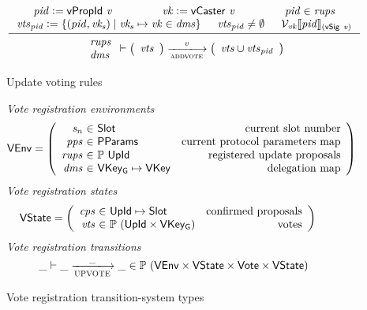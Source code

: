 \begin{figure}[htb]
  \begin{equation}
    \label{eq:rule:voting}
    \inference
    {
      \var{pid} \leteq \vPropId{v} & \var{vk} \leteq \vCaster{v} & \var{pid} \in \var{rups}\\
      \var{vts}_{\var{pid}} \leteq
      \{ (\var{pid}, \var{vk_s}) \mid \var{vk_s} \mapsto \var{vk} \in \var{dms} \} &
      \var{vts}_{\var{pid}} \neq \emptyset &
      \mathcal{V}_{\var{vk}}\serialised{\var{pid}}_{(\vSig{v})}\\
    }
    {
      {
        \begin{array}{l}
          \var{rups}\\
          \var{dms}
        \end{array}
      }
      \vdash
      {
        \left(
          \begin{array}{l}
            \var{vts}
          \end{array}
        \right)
      }
      \trans{addvote}{\var{v}}
      {
        \left(
          \begin{array}{l}
            \var{vts} \cup \var{vts}_{\var{pid}}\\
          \end{array}
        \right)
      }
    }
  \end{equation}
  \caption{Update voting rules}
  \label{fig:rules:voting}
\end{figure}

\clearpage

\begin{figure}[htb]
  \emph{Vote registration environments}
  \begin{align*}
    & \VEnv
      = \left(
      \begin{array}{r@{~\in~}lr}
        \var{s_n} & \Slot & \text{current slot number}\\
        \var{pps} & \PPMMap & \text{current protocol parameters map}\\
        \var{rups} & \powerset{\UPropId}
        & \text{registered update proposals}\\
        \var{dms} & \VKeyGen \mapsto \VKey & \text{delegation map}
      \end{array}\right)
  \end{align*}
  \emph{Vote registration states}
  \begin{align*}
    & \VState
      = \left(
      \begin{array}{r@{~\in~}lr}
        \var{cps} & \UPropId \mapsto \Slot & \text{confirmed proposals}\\
        \var{vts} & \powerset{(\UPropId \times \VKeyGen)} & \text{votes}
      \end{array}\right)
  \end{align*}
  \emph{Vote registration transitions}
    \begin{equation*}
    \_ \vdash \_ \trans{UPVOTE}{\_} \_ \in
    \powerset (\VEnv \times \VState \times \Vote \times \VState)
    \end{equation*}
  \caption{Vote registration transition-system types}
  \label{fig:ts-types:vote-reg}
\end{figure}

